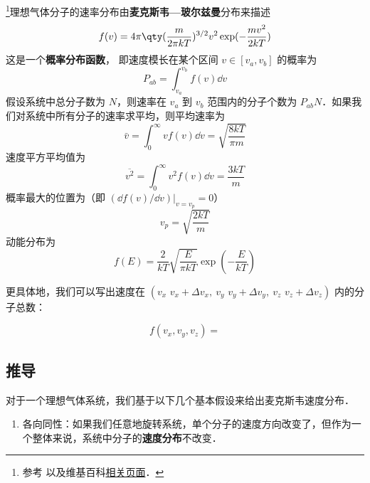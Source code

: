 
\begin{issues}
\issueDraft
\end{issues}

\footnote{参考 \cite{新热} 以及维基百科\href{https://en.wikipedia.org/wiki/Maxwell-Boltzmann_distribution}{相关页面}．}理想气体分子的速率分布由\textbf{麦克斯韦—玻尔兹曼}分布来描述
\begin{equation}
f(v) = 4\pi \qty(\frac{m}{2\pi kT})^{3/2} v^2 \exp(-\frac{mv^2}{2kT})
\end{equation}
这是一个\textbf{概率分布函数}， 即速度模长在某个区间 $v \in [v_a, v_b]$ 的概率为
\begin{equation}
P_{ab} = \int_{v_a}^{v_b} f(v) \dd{v}
\end{equation}
假设系统中总分子数为 $N$，则速率在 $v_a$ 到 $v_b$ 范围内的分子个数为 $P_{ab}N$．如果我们对系统中所有分子的速率求平均，则平均速率为
\begin{equation}
\bar v = \int_{0}^\infty v f(v)\dd v= \sqrt{\frac{8kT}{\pi m}}
\end{equation}
速度平方平均值为
\begin{equation}
\overline {v^2} = \int_{0}^\infty v^2 f(v)\dd v = \frac{3kT}{m}
\end{equation}
概率最大的位置为（即 $(\dd f(v)/\dd v)|_{v=v_p}=0$）
\begin{equation}
v_p =\sqrt{\frac{2kT}{m}}
\end{equation}
动能分布为
\begin{equation}
f(E) = \frac{2}{kT}\sqrt{\frac{E}{\pi kT}} \exp(-\frac{E}{kT})
\end{equation}

更具体地，我们可以写出速度在 $(v_x\text{~}v_x+\Delta v_x,\ v_y\text{~}v_y+\Delta v_y,\ v_z\text{~}v_z+\Delta v_z)$ 内的分子总数：

\begin{equation}
f(v_x,v_y,v_z)=
\end{equation}


\subsection{推导}
对于一个理想气体系统，我们基于以下几个基本假设来给出麦克斯韦速度分布．

\begin{enumerate}
\item 各向同性：如果我们任意地旋转系统，单个分子的速度方向改变了，但作为一个整体来说，系统中分子的\textbf{速度分布}不改变．
\end{enumerate}


